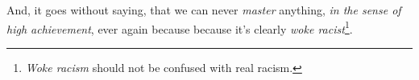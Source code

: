 And, it goes without saying, that we can never \emph{master} anything,
\emph{in the sense of high achievement}, ever again because because it's %
clearly \emph{woke racist}\footnote{\emph{Woke racism} should not be confused with real
  racism.
}.

%


%